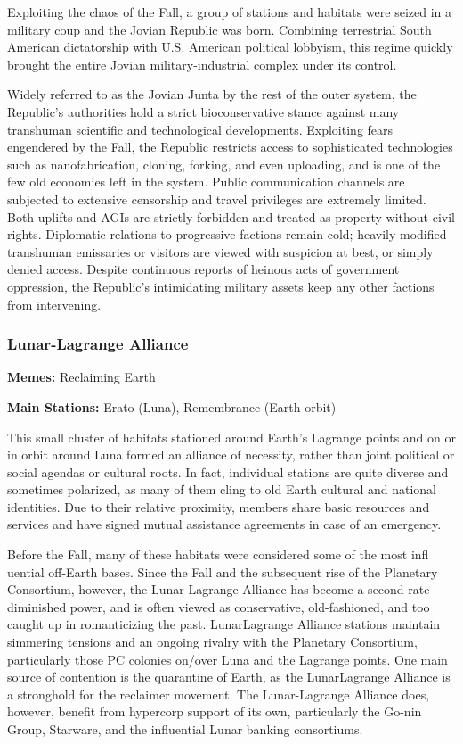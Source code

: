  Exploiting the chaos of the Fall, a group of stations and habitats were seized in a military coup and the Jovian Republic was born. Combining terrestrial South American dictatorship with U.S. American political lobbyism, this regime quickly brought the entire Jovian military-industrial complex under its control. 

Widely referred to as the Jovian Junta by the rest of the outer system, the Republic's authorities hold a strict bioconservative stance against many transhuman scientific and technological developments. Exploiting fears engendered by the Fall, the Republic restricts access to sophisticated technologies such as nanofabrication, cloning, forking, and even uploading, and is one of the few old economies left in the system. Public communication channels are subjected to extensive censorship and travel privileges are extremely limited. Both uplifts and AGIs are strictly forbidden and treated as property without civil rights. Diplomatic relations to progressive factions remain cold; heavily-modified transhuman emissaries or visitors are viewed with suspicion at best, or simply denied access. Despite continuous reports of heinous acts of government oppression, the Republic's intimidating military assets keep any other factions from intervening. 

\subsubsection{Lunar-Lagrange Alliance}
\label{sec:lunar-lagr-alli} 

\textbf{Memes:} Reclaiming Earth 

\textbf{Main Stations:} Erato (Luna), Remembrance (Earth orbit) 

 This small cluster of habitats stationed around Earth's Lagrange points and on or in orbit around Luna formed an alliance of necessity, rather than joint political or social agendas or cultural roots. In fact, individual stations are quite diverse and sometimes polarized, as many of them cling to old Earth cultural and national identities. Due to their relative proximity, members share basic resources and services and have signed mutual assistance agreements in case of an emergency. 

Before the Fall, many of these habitats were considered some of the most infl uential off-Earth bases. Since the Fall and the subsequent rise of the Planetary Consortium, however, the Lunar-Lagrange Alliance has become a second-rate diminished power, and is often viewed as conservative, old-fashioned, and too caught up in romanticizing the past. LunarLagrange Alliance stations maintain simmering tensions and an ongoing rivalry with the Planetary Consortium, particularly those PC colonies on/over Luna and the Lagrange points. One main source of contention is the quarantine of Earth, as the LunarLagrange Alliance is a stronghold for the reclaimer movement. The Lunar-Lagrange Alliance does, however, benefit from hypercorp support of its own, particularly the Go-nin Group, Starware, and the influential Lunar banking consortiums. 


